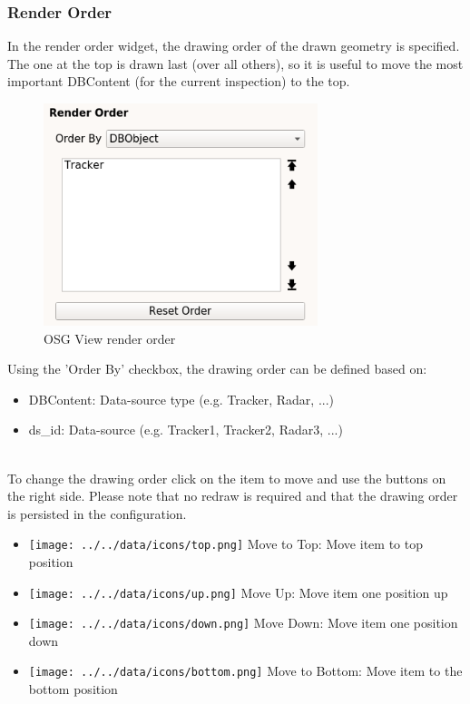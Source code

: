 \subsubsection{Render Order}

In the render order widget, the drawing order of the drawn geometry is specified. The one at the top is drawn last (over all others), so it is useful to move the most important DBContent (for the current inspection) to the top.

\begin{figure}[H]
    \includegraphics[width=8cm,frame]{figures/osgview_render_order.png}
  \caption{OSG View render order}
\end{figure}

Using the 'Order By' checkbox, the drawing order can be defined based on:
\begin{itemize}
 \item DBContent: Data-source type (e.g. Tracker, Radar, ...)
 \item ds\_id: Data-source (e.g. Tracker1, Tracker2, Radar3, ...)
\end{itemize}
\ \\

To change the drawing order click on the item to move and use the buttons on the right side. Please note that no redraw is required and that the drawing order is persisted in the configuration. \\

 \begin{itemize}
 \item \texttt{[image: ../../data/icons/top.png]} Move to Top: Move item to top position
 \item \texttt{[image: ../../data/icons/up.png]} Move Up: Move item one position up
 \item \texttt{[image: ../../data/icons/down.png]} Move Down: Move item one position down
 \item \texttt{[image: ../../data/icons/bottom.png]} Move to Bottom: Move item to the bottom position
\end{itemize}
